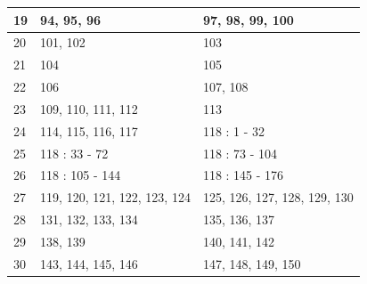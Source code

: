 {\begin{table}[h]
\begin{tabular}{|l|l|l|}
  19   & 94, 95, 96                   & 97, 98, 99, 100              \\ \hline
  20   & 101, 102                     & 103                          \\ \hline
  21   & 104                          & 105                          \\ \hline
  22   & 106                          & 107, 108                     \\ \hline
  23   & 109, 110, 111, 112           & 113                          \\ \hline
  24   & 114, 115, 116, 117           & 118 : 1 - 32                 \\ \hline
  25   & 118 : 33 - 72                & 118 : 73 - 104               \\ \hline
  26   & 118 : 105 - 144              & 118 : 145 - 176              \\ \hline
  27   & 119, 120, 121, 122, 123, 124 & 125, 126, 127, 128, 129, 130 \\ \hline
  28   & 131, 132, 133, 134           & 135, 136, 137                \\ \hline
  29   & 138, 139                     & 140, 141, 142                \\ \hline
  30   & 143, 144, 145, 146           & 147, 148, 149, 150           \\ \hline
  \end{tabular}
  \end{table}
}

\vfill\vfill

\newpage
